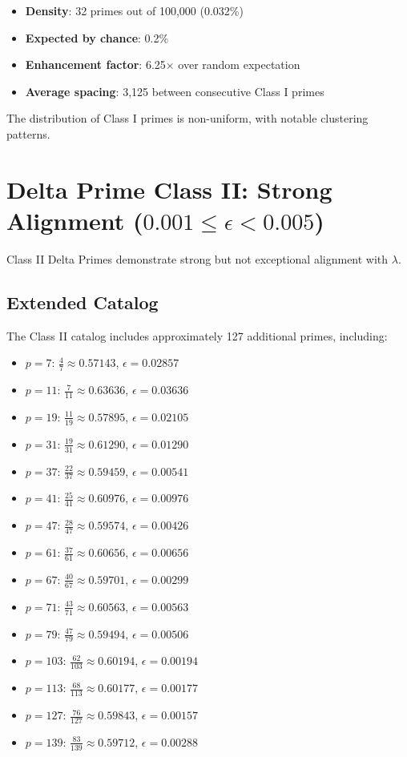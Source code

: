 \documentclass[12pt,a4paper]{report}
\newcommand{\lambdaval}{\lambda}
\begin{document}
\begin{itemize}
\item \textbf{Density}: 32 primes out of 100,000 (0.032\%)
\item \textbf{Expected by chance}: 0.2\%
\item \textbf{Enhancement factor}: 6.25× over random expectation
\item \textbf{Average spacing}: 3,125 between consecutive Class I primes
\end{itemize}

The distribution of Class I primes is non-uniform, with notable clustering patterns.

\section{Delta Prime Class II: Strong Alignment ($0.001 \leq \epsilon < 0.005$)}

Class II Delta Primes demonstrate strong but not exceptional alignment with $\lambdaval$.

\subsection{Extended Catalog}

The Class II catalog includes approximately 127 additional primes, including:

\begin{itemize}
\item $p = 7$: $\frac{4}{7} \approx 0.57143$, $\epsilon = 0.02857$
\item $p = 11$: $\frac{7}{11} \approx 0.63636$, $\epsilon = 0.03636$
\item $p = 19$: $\frac{11}{19} \approx 0.57895$, $\epsilon = 0.02105$
\item $p = 31$: $\frac{19}{31} \approx 0.61290$, $\epsilon = 0.01290$
\item $p = 37$: $\frac{22}{37} \approx 0.59459$, $\epsilon = 0.00541$
\item $p = 41$: $\frac{25}{41} \approx 0.60976$, $\epsilon = 0.00976$
\item $p = 47$: $\frac{28}{47} \approx 0.59574$, $\epsilon = 0.00426$
\item $p = 61$: $\frac{37}{61} \approx 0.60656$, $\epsilon = 0.00656$
\item $p = 67$: $\frac{40}{67} \approx 0.59701$, $\epsilon = 0.00299$
\item $p = 71$: $\frac{43}{71} \approx 0.60563$, $\epsilon = 0.00563$
\item $p = 79$: $\frac{47}{79} \approx 0.59494$, $\epsilon = 0.00506$
\item $p = 103$: $\frac{62}{103} \approx 0.60194$, $\epsilon = 0.00194$
\item $p = 113$: $\frac{68}{113} \approx 0.60177$, $\epsilon = 0.00177$
\item $p = 127$: $\frac{76}{127} \approx 0.59843$, $\epsilon = 0.00157$
\item $p = 139$: $\frac{83}{139} \approx 0.59712$, $\epsilon = 0.00288$
\end{itemize}
\end{document}
